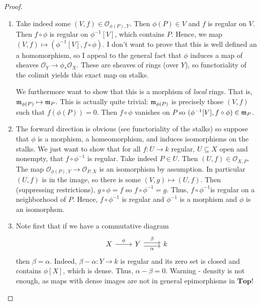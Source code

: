 \begin{proof}
    \begin{enumerate}[label = (\alph*)]
        \item Take indeed some $(V, f) \in \mathcal O_{\phi(P), Y}$. Then $\phi(P) \in V$ and $f$ is regular on $V$. Then $f \circ \phi$ is regular on $\phi^{-1}[V]$, which contains $P$. Hence, we map $(V, f) \mapsto (\phi^{-1}[V], f \circ \phi)$. I don't want to prove that this is well defined an a homomorphism, so I appeal to the general fact that $\phi$ induces a map of sheaves $\mathcal O_Y \longrightarrow \phi_* \mathcal O_X$. These are sheaves of rings (over $Y$), so functoriality of the colimit yields this exact map on stalks.

        We furthermore want to show that this is a morphism of \emph{local} rings. That is, $\mathfrak m_{\phi(P)} \mapsto \mathfrak m_P$. This is actually quite trivial: $\mathfrak m_{\phi(P)}$ is precisely those $(V, f)$ such that $f(\phi(P)) = 0$. Then $f \circ \phi$ vanishes on $P$ so $(\phi^{-1}[V], f \circ \phi) \in \mathfrak m_P$.

        \item The forward direction is obvious (see functoriality of the stalks) so suppose that $\phi$ is a morphism, a homeomorphism, and induces isomorphisms on the stalks. We just want to show that for all $f: U \longrightarrow k$ regular, $U \subseteq X$ open and nonempty, that $f \circ \phi^{-1}$ is regular. Take indeed $P \in U$. Then $(U, f) \in \mathcal O_{X, P}$. The map $\mathcal O_{\phi(P), Y} \longrightarrow \mathcal O_{P, X}$ is an isomorphism by assumption. In particular $(U, f)$ is in the image, so there is some $(V, g) \mapsto (U, f)$. Then (suppressing restrictions), $g \circ \phi = f$ so $f \circ \phi^{-1} = g$. Thus, $f \circ \phi^{-1}$is regular on a neighborhood of $P$. Hence, $f \circ \phi^{-1}$ is regular and $\phi^{-1}$ is a morphism and $\phi$ is an isomorphsm.

        \item Note first that if we have a commutative diagram
        $$
        \begin{tikzcd}
            X \arrow[r, "\phi"] & Y \arrow[r, "\alpha", swap, shift right] \arrow[r, "\beta", shift left] & k
        \end{tikzcd}
        $$
        then $\beta = \alpha$. Indeed, $\beta - \alpha: Y \longrightarrow k$ is regular and its zero set is closed and contains $\phi[X]$, which is dense. Thus, $\alpha - \beta = 0$. Warning - density is not enough, as maps with dense images are not in general epimorphisms in $\mathbf{Top}$!


\end{enumerate}
\end{proof}
